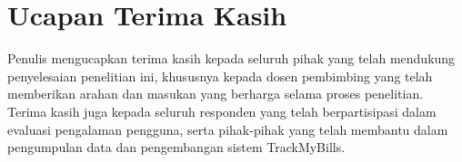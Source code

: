\section*{Ucapan Terima Kasih}

Penulis mengucapkan terima kasih kepada seluruh pihak yang telah mendukung penyelesaian penelitian ini, khususnya kepada dosen pembimbing yang telah memberikan arahan dan masukan yang berharga selama proses penelitian. Terima kasih juga kepada seluruh responden yang telah berpartisipasi dalam evaluasi pengalaman pengguna, serta pihak-pihak yang telah membantu dalam pengumpulan data dan pengembangan sistem TrackMyBills.